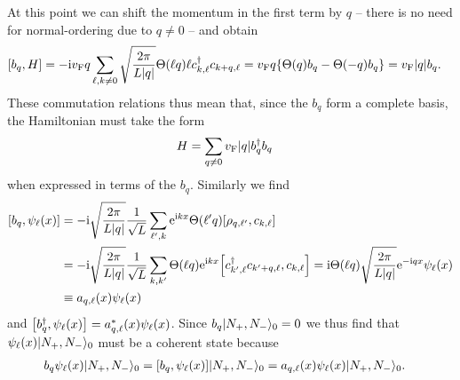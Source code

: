 \documentclass[english, parskip=full]{scrartcl}
\begin{document}
At this point we can shift the momentum in the first term by $q$ -- there is no need for normal-ordering due to $q\neq 0$ -- and obtain
\begin{align}
\klb*{b_q,H} &= -\i\vf q \sum_{\ell,k\neq 0} \sqrt{\frac{2\pi}{L|q|}} \Theta(\ell q) \ell c_{k,\ell}^\dagger c_{k+q,\ell} = \vf q \klc*{\Theta(q) b_q - \Theta(-q) b_q} = \vf |q| b_q.
\end{align}
These commutation relations thus mean that, since the $b_q$ form a complete basis, the Hamiltonian must take the form
\begin{align}
H &= \sum_{q\neq 0} \vf |q| b_q^\dagger b_q
\end{align}
when expressed in terms of the $b_q$.
Similarly we find
\begin{align}
\klb*{b_q, \psi_{\ell}(x)} &= -\i\sqrt{\frac{2\pi}{L|q|}} \frac{1}{\sqrt{L}} \sum_{\ell',k} \powe{\i kx} \Theta(\ell' q) \klb*{\rho_{q,\ell'}, c_{k,\ell}} \\
&= -\i\sqrt{\frac{2\pi}{L|q|}} \frac{1}{\sqrt{L}} \sum_{k,k'} \Theta(\ell q) \powe{\i kx} \klb*{c_{k',\ell}^\dagger c_{k'+q,\ell}, c_{k,\ell}} = \i\Theta(\ell q) \sqrt{\frac{2\pi}{L|q|}} \powe{-\i qx} \psi_\ell(x) \\
&\equiv  a_{q,\ell}(x)\psi_\ell(x)
\end{align}
and $\klb*{b_q^\dagger, \psi_\ell(x)} = a_{q,\ell}^\ast(x) \psi_\ell(x)$.
Since $b_q\Ket{N_+,N_-}_0 = 0$ we thus find that $\psi_\ell(x) \Ket{N_+, N_-}_0$ must be a coherent state because
\begin{align}
b_q\psi_\ell(x) \Ket{N_+, N_-}_0 &= \klb*{b_q, \psi_\ell(x)} \Ket{N_+, N_-}_0 = a_{q,\ell}(x) \psi_\ell(x) \Ket{N_+, N_-}_0.
\end{align}
\end{document}
